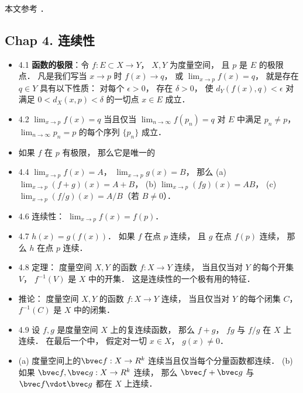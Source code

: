 
本文参考 \cite{Rudin}．

\subsection{Chap 4. 连续性}

\begin{itemize}
\item 4.1 \textbf{函数的极限}：令 $f:E\subset X\to Y$， $X,Y$ 为度量空间， 且 $p$ 是 $E$ 的极限点． 凡是我们写当 $x\to p$ 时 $f(x)\to q$， 或 $\lim_{x\to p}f(x)=q$， 就是存在 $q\in Y$ 具有以下性质： 对每个 $\epsilon>0$， 存在 $\delta>0$， 使 $d_{Y}(f(x),q)<\epsilon$ 对满足 $0<d_X(x,p)<\delta$ 的一切点 $x\in E$ 成立．

\item 4.2 $\lim_{x\to p}f(x)=q$ 当且仅当 $\lim_{n\to\infty} f(p_n)=q$ 对 $E$ 中满足 $p_n\ne p$， $\lim_{n\to\infty} p_n=p$ 的每个序列 $\{p_n\}$ 成立．

\item 如果 $f$ 在 $p$ 有极限， 那么它是唯一的

\item 4.4 $\lim_{x\to p}f(x)=A$， $\lim_{x\to p}g(x)=B$， 那么 (a) $\lim_{x\to p}(f+g)(x)=A+B$， (b) $\lim_{x\to p}(fg)(x)=AB$， (c) $\lim_{x\to p}(f/g)(x)=A/B$（若 $B\ne 0$）．

\item 4.6 连续性： $\lim_{x\to p}f(x)=f(p)$．

\item 4.7 $h(x) = g(f(x))$． 如果 $f$ 在点 $p$ 连续， 且 $g$ 在点 $f(p)$ 连续， 那么 $h$ 在点 $p$ 连续．

\item 4.8 定理： 度量空间 $X,Y$ 的函数 $f:X\to Y$ 连续， 当且仅当对 $Y$ 的每个开集 $V$， $f^{-1}(V)$ 是 $X$ 中的开集． 这是连续性的一个极有用的特征．

\item 推论： 度量空间 $X,Y$ 的函数 $f:X\to Y$ 连续， 当且仅当对 $Y$ 的每个闭集 $C$， $f^{-1}(C)$ 是 $X$ 中的闭集．

\item 4.9 设 $f,g$ 是度量空间 $X$ 上的复连续函数， 那么 $f+g$， $fg$ 与 $f/g$ 在 $X$ 上连续． 在最后一个中， 假定对一切 $x\in X$， $g(x)\ne 0$．

\item (a) 度量空间上的$\bvec f:X\to R^k$ 连续当且仅当每个分量函数都连续． (b) 如果 $\bvec f, \bvec g:X\to R^k$ 连续， 那么 $\bvec f+\bvec g$ 与 $\bvec f\vdot \bvec g$ 都在 $X$ 上连续．


\end{itemize}
